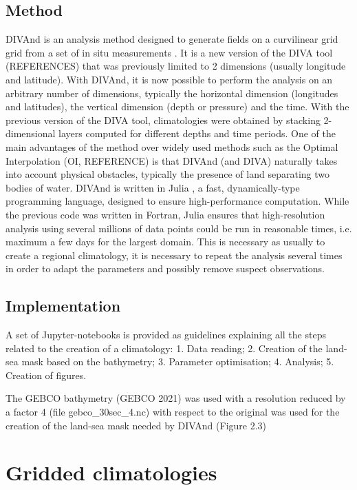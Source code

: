 \documentclass[essd, manuscript]{copernicus}
\begin{document}
\subsection{Method}

DIVAnd is an analysis method designed to generate fields on a curvilinear grid grid from a set of in situ measurements \citep{BARTH2014}. It is a new version of the DIVA tool (REFERENCES) that was previously limited to 2 dimensions (usually longitude and latitude). With DIVAnd, it is now possible to perform the analysis on an arbitrary number of dimensions, typically the horizontal dimension (longitudes and latitudes), the vertical dimension (depth or pressure) and the time. With the previous version of  the DIVA tool, climatologies were obtained by stacking 2-dimensional layers computed for different depths and time periods. 
One of the main advantages of the method over widely used methods such as the Optimal Interpolation (OI, REFERENCE) is that DIVAnd (and DIVA) naturally takes into account physical obstacles, typically the presence of land separating two bodies of water.  
DIVAnd is written in Julia \citep{Bezanson2017}, a fast, dynamically-type programming language, designed to ensure high-performance computation. While the previous code was written in Fortran, Julia ensures that high-resolution analysis using several millions of data points could be run in reasonable times, i.e. maximum a few days for the largest domain. This is necessary as usually to create a regional climatology, it is necessary to repeat the analysis several times in order to adapt the parameters and possibly remove suspect observations.

\subsection{Implementation}

\citep{TROUPIN2025}
A set of Jupyter-notebooks \citep[https://jupyter.org][]{KLUYVER2016} is
provided as guidelines explaining all the steps related to the creation of a climatology:
1. Data reading;
2. Creation of the land-sea mask based on the bathymetry;
3. Parameter optimisation;
4. Analysis;
5. Creation of figures.


The GEBCO bathymetry (GEBCO 2021) was used with a resolution reduced by a factor 4 (file
gebco_30sec_4.nc) with respect to the original was used for the creation of the land-sea mask
needed by DIVAnd (Figure 2.3)


\section{Gridded climatologies\label{sec:clim}}
\end{document}
